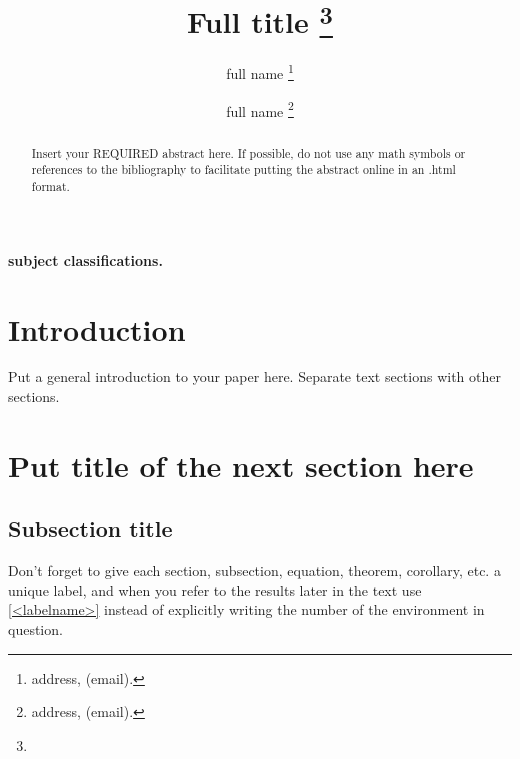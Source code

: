 \documentclass{cmslatex}
\begin{document}
\title{Full title
\thanks{%
}}
\author{full name
\thanks {address, (email).}
\and full name \thanks {address, (email).}}



\pagestyle{myheadings} \maketitle

\begin{abstract}
Insert your REQUIRED abstract here. If possible, do not use any
math symbols or references to the bibliography to facilitate
putting the abstract online in an .html
          format.
\end{abstract}

\begin{keywords}
\smallskip

{\bf subject classifications.}
\end{keywords}


\section{Introduction}\label{intro}

Put a general  introduction to your paper here. Separate text
sections with other sections.

\section{Put title of the next section here}\label{an apprpriate
label}

\subsection{Subsection title}\label{another label}

Don't forget to give each section, subsection, equation, theorem,
corollary, etc. a unique label, and when you refer to the results
later in the text use \ref{<labelname>} instead of explicitly
writing the number of the environment in question.
\end{document}
